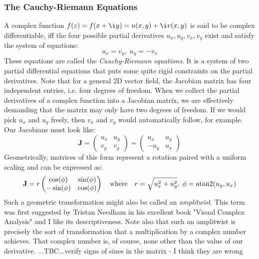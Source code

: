 

\subsubsection{The Cauchy-Riemann Equations}
A complex function $f(z) = f(x + \i y) = u(x,y) + \i v(x,y)$ is said to be complex differentiable, iff the four possible partial derivatives $u_x, u_y, v_x, v_y$ exist and satisfy the system of equations:
\begin{equation}
 u_x = v_y, \; u_y = -v_x
\end{equation}
These equations are called the \emph{Cauchy-Riemann equations}. It is a system of two partial differential equations that puts some quite rigid constraints on the partial derivatives. Note that for a general 2D vector field, the Jacobian matrix has four independent entries, i.e. four degrees of freedom. When we collect the partial derivatives of a complex function into a Jacobian matrix, we are effectively demanding that the matrix may only have two degrees of freedom. If we would pick $u_x$ and $u_y$ freely, then $v_x$ and $v_y$ would automatically follow, for example. Our Jacobians must look like:
\begin{equation}
 \mathbf{J} =   \begin{pmatrix} u_x & u_y \\	 v_y & v_y \end{pmatrix}
            =   \begin{pmatrix} u_x & u_y \\	-u_y & u_x \end{pmatrix}
\end{equation}
Geometrically, matrices of this form represent a rotation paired with a uniform scaling and can be expressed as:
\begin{equation}
	 \mathbf{J} = r \begin{pmatrix}  \cos(\phi)   & \sin(\phi)   \\	
                              	 	-\sin(\phi)   & \cos(\phi)   \end{pmatrix}
	\quad \text{where}  \quad
	r = \sqrt{u_x^2 + u_y^2}, \; \phi = \atan2(u_y, u_x)
\end{equation}
Such a geometric transformation might also be called an \emph{amplitwist}. This term was first suggested by Tristan Needham in his excellent book "Visual Complex Analysis" and I like its descriptiveness. Note also that such an amplitwist is precisely the sort of transformation that a multiplication by a complex number achieves. That complex number is, of course, none other than the value of our derivative. ...TBC...verify signs of sines in the matrix - I think they are wrong

